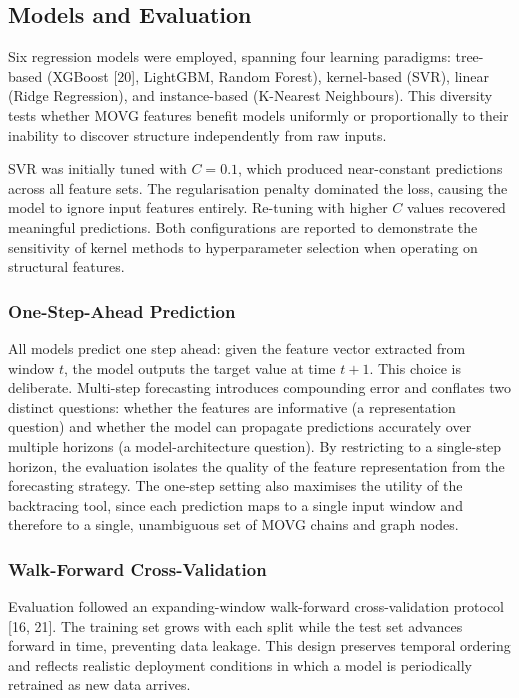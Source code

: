 \documentclass[a4paper,12pt]{article}
\begin{document}
\subsection{Models and Evaluation}
\label{sec:models-evaluation}

Six regression models were employed, spanning four learning paradigms: tree-based (XGBoost [20], LightGBM, Random Forest), kernel-based (SVR), linear (Ridge Regression), and instance-based (K-Nearest Neighbours). This diversity tests whether MOVG features benefit models uniformly or proportionally to their inability to discover structure independently from raw inputs.

SVR was initially tuned with $C{=}0.1$, which produced near-constant predictions across all feature sets. The regularisation penalty dominated the loss, causing the model to ignore input features entirely. Re-tuning with higher $C$ values recovered meaningful predictions. Both configurations are reported to demonstrate the sensitivity of kernel methods to hyperparameter selection when operating on structural features.

\subsubsection{One-Step-Ahead Prediction}

All models predict one step ahead: given the feature vector extracted from window $t$, the model outputs the target value at time $t{+}1$. This choice is deliberate. Multi-step forecasting introduces compounding error and conflates two distinct questions: whether the features are informative (a representation question) and whether the model can propagate predictions accurately over multiple horizons (a model-architecture question). By restricting to a single-step horizon, the evaluation isolates the quality of the feature representation from the forecasting strategy. The one-step setting also maximises the utility of the backtracing tool, since each prediction maps to a single input window and therefore to a single, unambiguous set of MOVG chains and graph nodes.

\subsubsection{Walk-Forward Cross-Validation}

Evaluation followed an expanding-window walk-forward cross-validation protocol [16, 21]. The training set grows with each split while the test set advances forward in time, preventing data leakage. This design preserves temporal ordering and reflects realistic deployment conditions in which a model is periodically retrained as new data arrives.
\end{document}
